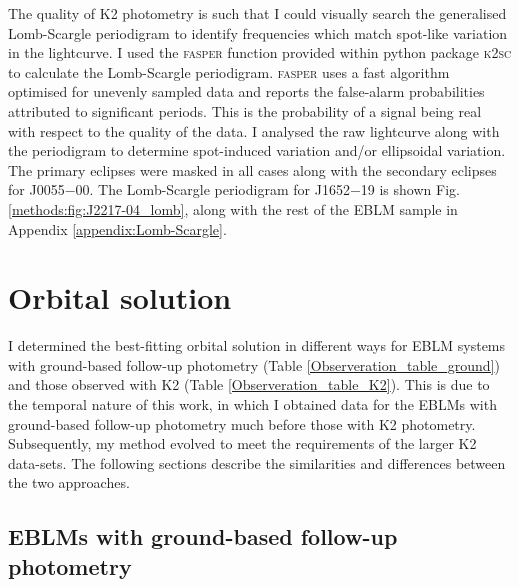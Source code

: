 The quality of K2 photometry is such that I could visually search the generalised Lomb-Scargle periodigram to identify frequencies which match spot-like variation in the lightcurve. I used the \textsc{fasper} function provided within python package \textsc{k2sc} to calculate the Lomb-Scargle periodigram.  \textsc{fasper} uses a fast algorithm optimised for unevenly sampled data \citep{1989ApJ...338..277P} and reports the false-alarm probabilities attributed to significant periods. This is the probability of a signal being real with respect to the quality of the data. I analysed the raw lightcurve along with the periodigram to determine spot-induced variation and/or ellipsoidal variation. The primary eclipses were masked in all cases along with the secondary eclipses for J0055$-$00. The Lomb-Scargle periodigram for J1652$-$19 is shown Fig. \ref{methods:fig:J2217-04_lomb}, along with the rest of the EBLM sample in Appendix \ref{appendix:Lomb-Scargle}. 













\section{Orbital solution}\label{method:orbital_fit}

I determined the best-fitting orbital solution in different ways for EBLM systems with ground-based follow-up photometry (Table \ref{Observeration_table_ground}) and those observed with K2 (Table \ref{Observeration_table_K2}). This is due to the temporal nature of this work, in which I obtained data for the EBLMs with ground-based follow-up photometry much before those with K2 photometry. Subsequently, my method evolved to meet the requirements of the larger K2 data-sets. The following sections describe the similarities and differences between the two approaches. 

\subsection{EBLMs with ground-based follow-up photometry}


